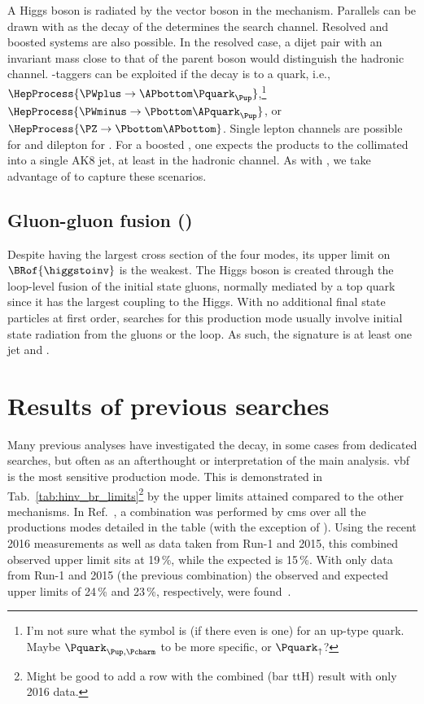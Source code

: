 A Higgs boson is radiated by the vector boson \PVec in the \VH mechanism. Parallels can be drawn with \ttH as the decay of the \PVec determines the search channel. Resolved and boosted systems are also possible. In the resolved case, a dijet pair with an invariant mass close to that of the parent boson would distinguish the hadronic channel. \Pbottom-taggers can be exploited if the decay is to a \Pbottom quark, i.e., $\HepProcess{\PWplus \to \APbottom\Pquark_{\Pup}}$,\footnote{I'm not sure what the symbol is (if there even is one) for an up-type quark. Maybe $\Pquark_{\Pup, \Pcharm}$ to be more specific, or $\Pquark_{\uparrow}$?} $\HepProcess{\PWminus \to \Pbottom\APquark_{\Pup}}$, or $\HepProcess{\PZ \to \Pbottom\APbottom}$. Single lepton channels are possible for \WH and dilepton for \ZH. For a boosted \PVec, one expects the products to the collimated into a single AK8 \gls{jet}, at least in the hadronic channel. As with \ttH, we take advantage of \deepakeight to capture these scenarios. 




\subsection{Gluon-gluon fusion (\texorpdfstring{\ggF}{ggF})}
\label{subsec:htoinv_ggF}

Despite \ggF having the largest cross section of the four modes, its upper limit on $\BRof{\higgstoinv}$ is the weakest. The Higgs boson is created through the loop-level fusion of the initial state gluons, normally mediated by a top quark since it has the largest coupling to the Higgs. With no additional final state particles at first order, searches for this production mode usually involve initial state radiation from the gluons or the loop. As such, the signature is at least one \gls{jet} and \ptmiss.




\section{Results of previous searches}
\label{sec:htoinv_prev_results}

Many previous analyses have investigated the \higgstoinv decay, in some cases from dedicated searches, but often as an afterthought or interpretation of the main analysis. \acrshort{vbf} is the most sensitive production mode. This is demonstrated in Tab.~\ref{tab:hinv_br_limits}\footnote{Might be good to add a row with the combined (bar ttH) result with only 2016 data.} by the upper limits attained compared to the other mechanisms. In Ref.~, a combination was performed by \acrshort{cms} over all the productions modes detailed in the table (with the exception of \ttH). Using the recent 2016 measurements as well as data taken from Run-1 and 2015, this combined observed upper limit sits at 19\,\%, while the expected is 15\,\%. With only data from Run-1 and 2015 (the previous combination) the observed and expected upper limits of 24\,\% and 23\,\%, respectively, were found~\cite{Khachatryan:2016whc}.


